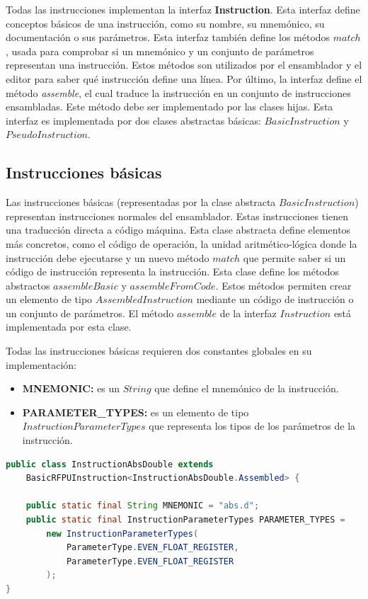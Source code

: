 Todas las instrucciones implementan la interfaz \textbf{Instruction}.
Esta interfaz define conceptos básicos de una instrucción,
como su nombre, su mnemónico, su documentación o sus parámetros.
Esta interfaz también define los métodos $match$,
usada para comprobar si un mnemónico y un conjunto de parámetros
representan una instrucción.
Estos métodos son utilizados por el ensamblador y el editor para saber qué
instrucción define una línea.
Por último, la interfaz define el método \textit{assemble}, el
cual traduce la instrucción en un conjunto de instrucciones ensambladas.
Este método debe ser implementado por las clases hijas.
Esta interfaz es implementada por dos clases abstractas básicas:
$BasicInstruction$ y $PseudoInstruction$.

\subsection{Instrucciones básicas}\label{subsec:instrucciones-basicas}

Las instrucciones básicas (representadas por la clase abstracta
$BasicInstruction$) representan instrucciones normales del ensamblador.
Estas instrucciones tienen una traducción directa a código máquina.
Esta clase abstracta define elementos más concretos, como el código de operación,
la unidad aritmético-lógica donde la instrucción debe ejecutarse y
un nuevo método $match$ que permite saber si un código de instrucción
representa la instrucción.
Esta clase define los métodos abstractos $assembleBasic$
y $assembleFromCode$.
Estos métodos permiten crear un elemento de tipo $AssembledInstruction$
mediante un código de instrucción o un conjunto de parámetros.
El método $assemble$ de la interfaz $Instruction$
está implementada por esta clase.

\noindent Todas las instrucciones básicas requieren dos
constantes globales en su implementación:
\begin{itemize}
    \item \textbf{MNEMONIC:} es un $String$ que define
    el mnemónico de la instrucción.
    \item \textbf{PARAMETER\_TYPES:} es un elemento de tipo
    $InstructionParameterTypes$ que representa
    los tipos de los parámetros de la instrucción.
\end{itemize}

\begin{lstlisting}[language=Java,style=java,frame=single,label={lst:basic-instruction}]
public class InstructionAbsDouble extends
    BasicRFPUInstruction<InstructionAbsDouble.Assembled> {

    public static final String MNEMONIC = "abs.d";
    public static final InstructionParameterTypes PARAMETER_TYPES =
        new InstructionParameterTypes(
            ParameterType.EVEN_FLOAT_REGISTER,
            ParameterType.EVEN_FLOAT_REGISTER
        );
}
\end{lstlisting}

